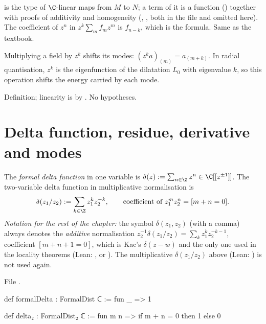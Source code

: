 \begin{dictionary}
 is the type of $\C$-linear maps from $M$ to $N$; a term of it is a function
() together with proofs of additivity and homogeneity (, , both
 in the file and omitted here). The coefficient of $z^n$ in $z^k\sum_mf_mz^m$ is $f_{n-k}$, which is
the formula. Same as the textbook.
\end{dictionary}

\begin{physics}
Multiplying a field by $z^k$ shifts its modes: $(z^ka)_{(m)} = a_{(m+k)}$. In radial quantisation,
$z^k$ is the eigenfunction of the dilatation $L_0$ with eigenvalue $k$, so this operation shifts the
energy carried by each mode.
\end{physics}

\begin{status}
Definition; linearity is by . No hypotheses.
\end{status}

\section{Delta function, residue, derivative and modes}\label{l01:sec:delta}

\begin{definition}\label{l01:def:delta}
The \emph{formal delta function} in one variable is $\delta(z) := \sum_{n\in\Z}z^n\in\C[[z^{\pm1}]]$.
The two-variable delta function in multiplicative normalisation is
\begin{equation*}
  \delta(z_1/z_2) := \sum_{k\in\Z}z_1^{k}z_2^{-k},\qquad\text{coefficient of }z_1^mz_2^n = [m+n = 0].
\end{equation*}
\emph{Notation for the rest of the chapter:} the symbol $\delta(z_1,z_2)$ (with a comma) always denotes the
\emph{additive} normalisation $z_2^{-1}\delta(z_1/z_2) = \sum_kz_1^kz_2^{-k-1}$, coefficient $[m+n+1 = 0]$, which is
Kac's $\delta(z-w)$ and the only one used in the locality theorems (Lean: , or
). The multiplicative $\delta(z_1/z_2)$ above (Lean: ) is not used again.
\end{definition}

\noindent File .
\begin{leancode}
def formalDelta : FormalDist ℂ := fun _ => 1

def delta₂ : FormalDist₂ ℂ := fun m n => if m + n = 0 then 1 else 0
\end{leancode}

